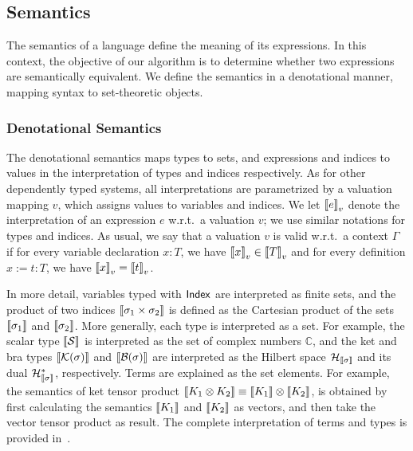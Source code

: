 





\subsection{Semantics}

The semantics of a language define the meaning of its expressions. In this context, the objective of our algorithm is to determine whether two expressions are semantically equivalent. We define the semantics in a denotational manner, mapping syntax to set-theoretic objects.

\subsubsection{Denotational Semantics}
The denotational semantics maps types to sets, and expressions and
indices to values in the interpretation of types and indices
respectively. As for other dependently typed systems, all
interpretations are parametrized by a valuation mapping \( v \), which
assigns values to variables and indices. We let \( {\llbracket e \rrbracket}_v \) denote
the interpretation of an expression $e$ w.r.t.\, a valuation \( v \);
we use similar notations for types and indices. As usual, we say that
a valuation \( v \) is valid w.r.t.\, a context $\Gamma$ if for every
variable declaration $x:T$, we have \( {\llbracket x \rrbracket}_v \in{\llbracket T \rrbracket}_v \) and
for every definition $x:= t: T$, we have  \( {\llbracket x \rrbracket}_v={\llbracket t \rrbracket}_v \).


In more detail, variables typed with \( \mathsf{Index} \) are interpreted as
finite sets, and the product of two indices \( {\llbracket \sigma_1 \times
  \sigma_2 \rrbracket} \) is defined as the Cartesian product of the sets \(
{\llbracket \sigma_1 \rrbracket} \) and \( {\llbracket \sigma_2 \rrbracket} \). More generally, each type
is interpreted as a set. For example, the scalar type \( {\llbracket \mathcal{S} \rrbracket}
\) is interpreted as the set of complex numbers \( \mathbb{C} \), and
the ket and bra types \( {\llbracket \mathcal{K}(\sigma) \rrbracket} \) and \(
{\llbracket \mathcal{B}(\sigma) \rrbracket} \) are interpreted as the Hilbert space \(
\mathcal{H}_{{\llbracket \sigma \rrbracket}} \) and its dual \(
\mathcal{H}_{{\llbracket \sigma \rrbracket}}^* \), respectively. Terms are explained as
the set elements. For example, the semantics of ket tensor product
${\llbracket K_1 \otimes K_2 \rrbracket} \equiv {\llbracket K_1 \rrbracket} \otimes {\llbracket K_2 \rrbracket}$, is
obtained by first calculating the semantics ${\llbracket K_1 \rrbracket}$ and
${\llbracket K_2 \rrbracket}$ as vectors, and then take the vector tensor product as
result.  The complete interpretation of terms and types is provided
in~.

